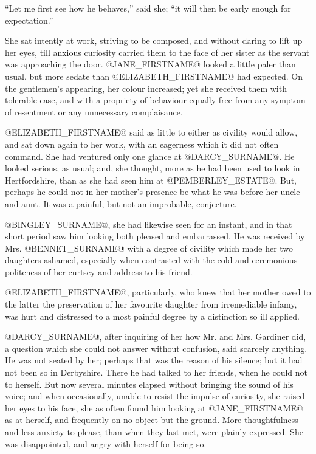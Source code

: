 ``Let me first see how he behaves,'' said she; ``it will then be early
enough for expectation.''

She sat intently at work, striving to be composed, and without daring to
lift up her eyes, till anxious curiosity carried them to the face of
her sister as the servant was approaching the door. @JANE_FIRSTNAME@ looked a little
paler than usual, but more sedate than @ELIZABETH_FIRSTNAME@ had expected. On the
gentlemen's appearing, her colour increased; yet she received them with
tolerable ease, and with a propriety of behaviour equally free from any
symptom of resentment or any unnecessary complaisance.

@ELIZABETH_FIRSTNAME@ said as little to either as civility would allow, and sat down
again to her work, with an eagerness which it did not often command. She
had ventured only one glance at @DARCY_SURNAME@. He looked serious, as usual; and,
she thought, more as he had been used to look in Hertfordshire, than as
she had seen him at @PEMBERLEY_ESTATE@. But, perhaps he could not in her mother's
presence be what he was before her uncle and aunt. It was a painful, but
not an improbable, conjecture.

@BINGLEY_SURNAME@, she had likewise seen for an instant, and in that short period
saw him looking both pleased and embarrassed. He was received by Mrs.
@BENNET_SURNAME@ with a degree of civility which made her two daughters ashamed,
especially when contrasted with the cold and ceremonious politeness of
her curtsey and address to his friend.

@ELIZABETH_FIRSTNAME@, particularly, who knew that her mother owed to the latter
the preservation of her favourite daughter from irremediable infamy,
was hurt and distressed to a most painful degree by a distinction so ill
applied.

@DARCY_SURNAME@, after inquiring of her how Mr. and Mrs. Gardiner did, a question
which she could not answer without confusion, said scarcely anything. He
was not seated by her; perhaps that was the reason of his silence; but
it had not been so in Derbyshire. There he had talked to her friends,
when he could not to herself. But now several minutes elapsed without
bringing the sound of his voice; and when occasionally, unable to resist
the impulse of curiosity, she raised her eyes to his face, she as often
found him looking at @JANE_FIRSTNAME@ as at herself, and frequently on no object but
the ground. More thoughtfulness and less anxiety to please, than when
they last met, were plainly expressed. She was disappointed, and angry
with herself for being so.


